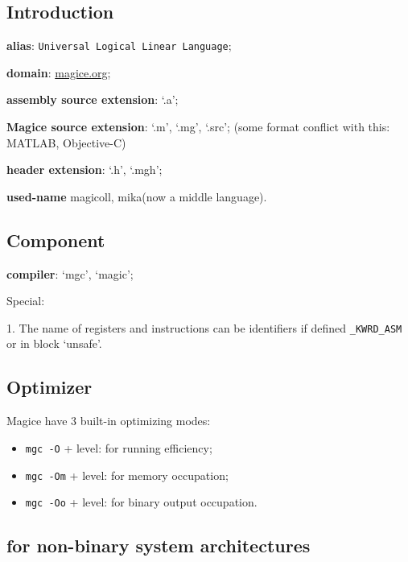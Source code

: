 


\subsection{Introduction}

\textbf{alias}: \texttt{Universal Logical Linear Language};

\textbf{domain}: \href{http://magice.org}{magice.org};

\textbf{assembly source extension}: `.a';

\textbf{Magice source extension}: `.m', `.mg', `.src'; (some format conflict with this: MATLAB, Objective-C)

\textbf{header extension}: `.h', `.mgh';

\textbf{used-name} magicoll, mika(now a middle language).



\subsection{Component}

\textbf{compiler}: `mgc', `magic';

Special:

1. The name of registers and instructions can be identifiers if defined \verb|_KWRD_ASM| or in block `unsafe'.



\subsection{Optimizer}

Magice have 3 built-in optimizing modes:

\begin{itemize}

\item \verb|mgc -O| + level: for running efficiency;
\item \verb|mgc -Om| + level: for memory occupation;
\item \verb|mgc -Oo| + level: for binary output occupation.
\end{itemize}



\subsection{for non-binary system architectures}

